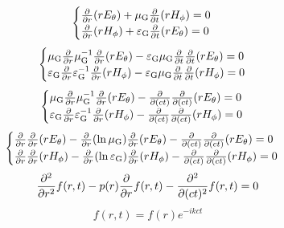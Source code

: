 \begin{equation}
    \begin{cases}
        \frac{\partial}{\partial r}(r{E}_\theta)+\mu_{\text{G}}\frac{\partial}{\partial t}(r{H}_\phi)=0\\
        \frac{\partial}{\partial r}(r{H}_\phi)+\varepsilon_{\text{G}}\frac{\partial}{\partial t}(r{E}_\theta)=0\\
    \end{cases}
\end{equation}
\begin{equation}
    \begin{cases}
        \mu_{\text{G}}\frac{\partial}{\partial r}\mu_{\text{G}}^{-1}\frac{\partial}{\partial r}(r{E}_\theta)-\varepsilon_{\text{G}}\mu_{\text{G}}\frac{\partial}{\partial t}\frac{\partial}{\partial t}(r{E}_\theta)=0\\
        \varepsilon_{\text{G}}\frac{\partial}{\partial r}\varepsilon_{\text{G}}^{-1}\frac{\partial}{\partial r}(r{H}_\phi)-\varepsilon_{\text{G}}\mu_{\text{G}}\frac{\partial}{\partial t}\frac{\partial}{\partial t}(r{H}_\phi)=0\\
    \end{cases}
\end{equation}
\begin{equation}
    \begin{cases}
        \mu_{\text{G}}\frac{\partial}{\partial r}\mu_{\text{G}}^{-1}\frac{\partial}{\partial r}(r{E}_\theta)-\frac{\partial}{\partial(ct)}\frac{\partial}{\partial(ct)}(r{E}_\theta)=0\\
        \varepsilon_{\text{G}}\frac{\partial}{\partial r}\varepsilon_{\text{G}}^{-1}\frac{\partial}{\partial r}(r{H}_\phi)-\frac{\partial}{\partial(ct)}\frac{\partial}{\partial(ct)}(r{H}_\phi)=0\\
    \end{cases}
\end{equation}
\begin{equation}
    \begin{cases}
        \frac{\partial}{\partial r}\frac{\partial}{\partial r}(r{E}_\theta)-\frac{\partial}{\partial r}(\ln\mu_{\text{G}})\frac{\partial}{\partial r}(r{E}_\theta)-\frac{\partial}{\partial(ct)}\frac{\partial}{\partial(ct)}(r{E}_\theta)=0\\
        \frac{\partial}{\partial r}\frac{\partial}{\partial r}(r{H}_\phi)-\frac{\partial}{\partial r}(\ln\varepsilon_{\text{G}})\frac{\partial}{\partial r}(r{H}_\phi)-\frac{\partial}{\partial(ct)}\frac{\partial}{\partial(ct)}(r{H}_\phi)=0\\
    \end{cases}
\end{equation}
\begin{equation}
    \frac{\partial^2}{\partial r^2}f(r,t)-p(r)\frac{\partial}{\partial r}f(r,t)-\frac{\partial^2}{\partial (ct)^2}f(r,t)=0
\end{equation}
\begin{equation}
    f(r,t)=f(r)e^{-ikct}
\end{equation}
